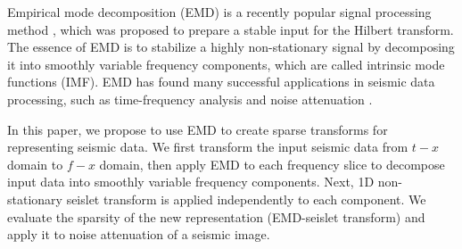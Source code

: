 Empirical mode decomposition (EMD) is a recently popular signal processing method \cite[]{huangemd}, which was proposed to prepare a stable input for the Hilbert transform.  The essence of EMD is to stabilize a highly non-stationary signal by decomposing it into smoothly variable frequency components, which are called  intrinsic mode functions (IMF). EMD has found many successful applications in seismic data processing, such as time-frequency analysis \cite[]{jiajun2013} and noise attenuation \cite[]{bekara2009,yangkang20141,yangkang2014emdsum,yangkang2015}. 

In this paper, we propose to use EMD to create sparse transforms for representing seismic data. %
We first transform the input seismic data from $t-x$ domain to $f-x$ domain, then apply EMD to each frequency slice to decompose input data into smoothly variable frequency components. Next, 1D non-stationary seislet transform is applied independently to each component. We evaluate the sparsity of the new representation (EMD-seislet transform) and apply it to noise attenuation of a seismic image.




